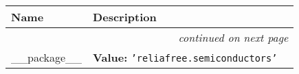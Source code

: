     \vspace{-1cm}
\hspace{\varindent}\begin{longtable}{|p{\varnamewidth}|p{\vardescrwidth}|l}
\cline{1-2}
\cline{1-2} \centering \textbf{Name} & \centering \textbf{Description}& \\
\cline{1-2}
\endhead\cline{1-2}\multicolumn{3}{r}{\small\textit{continued on next page}}\\\endfoot\cline{1-2}
\endlastfoot\raggedright \_\-\_\-p\-a\-c\-k\-a\-g\-e\-\_\-\_\- & \raggedright \textbf{Value:} 
{\tt \texttt{'}\texttt{reliafree.semiconductors}\texttt{'}}&\\
\cline{1-2}
\end{longtable}

